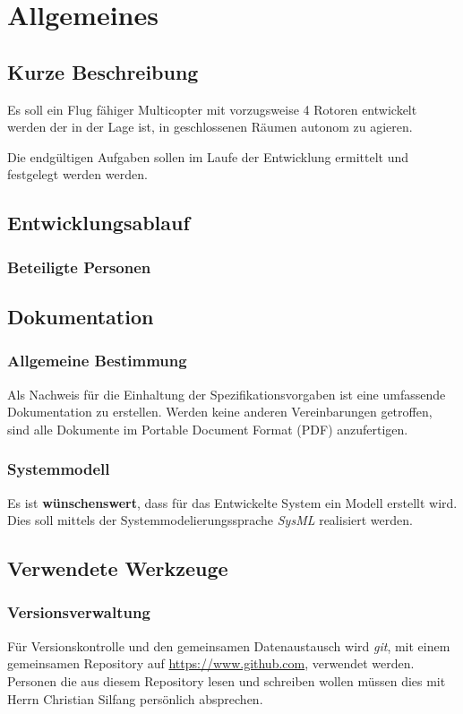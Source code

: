 \section{Allgemeines}
\subsection{Kurze Beschreibung}
	Es soll ein Flug fähiger Multicopter mit vorzugsweise 4 Rotoren entwickelt werden der in der Lage ist,
	in geschlossenen Räumen autonom zu agieren. 

	Die endgültigen Aufgaben sollen im Laufe der Entwicklung ermittelt und festgelegt werden werden.
	
\subsection{Entwicklungsablauf}
	\subsubsection{Beteiligte Personen}
		
	
	
\subsection{Dokumentation}
	\subsubsection{Allgemeine Bestimmung}
		Als Nachweis für die Einhaltung der Spezifikationsvorgaben ist eine umfassende 
		Dokumentation zu erstellen. Werden keine anderen Vereinbarungen getroffen,
		sind alle Dokumente im Portable Document Format (PDF) anzufertigen.
	
	\subsubsection{Systemmodell}
		Es ist \textbf{wünschenswert}, dass für das Entwickelte System ein Modell erstellt wird.
		Dies soll mittels der Systemmodelierungssprache \textit{SysML} realisiert werden.


\subsection{Verwendete Werkzeuge}
	\subsubsection{Versionsverwaltung}
		Für Versionskontrolle und den gemeinsamen Datenaustausch wird \textit{git}, mit einem 
		gemeinsamen Repository auf \url{https://www.github.com}, verwendet werden.
		Personen die aus diesem Repository lesen und schreiben wollen müssen dies mit Herrn 
		Christian Silfang persönlich absprechen.
		
